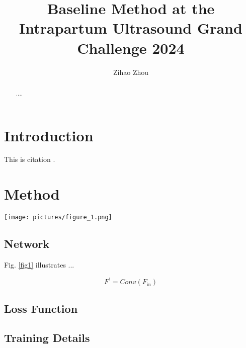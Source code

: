 \documentclass[runningheads]{llncs}
\begin{document}
%
\title{Baseline Method at the Intrapartum Ultrasound Grand Challenge 2024}
%
%
\author{Zihao Zhou}
%
%
%
\maketitle              %
%

\begin{abstract}
....
\end{abstract}


\section{Introduction}

This is citation \cite{ronneberger2015u}.

\section{Method}

\begin{figure*}[!b]
\centering
\texttt{[image: pictures/figure\_1.png]}
\caption{An overview of the baseline method network architecture.} 
\label{fig1}
\end{figure*}
\subsection{Network}

Fig. \ref{fig1} illustrates ... 



\begin{equation}
F^{\prime}= Conv\left( F_{\mathrm{in}} \right)
\end{equation}

\subsection{Loss Function}

\subsection{Training Details}
\end{document}
